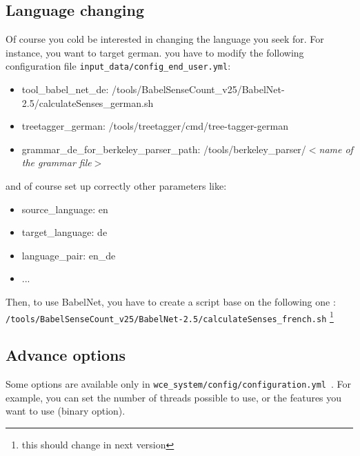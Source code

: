 \documentclass[a4paper,12pt]{article}
\begin{document}
\subsection{Language changing}
Of course you cold be interested in changing the language you seek for. For instance, you want to target german.
you have to modify the following configuration file \texttt{input\_data/config\_end\_user.yml}:
\begin{itemize}
 \item tool\_babel\_net\_de: /tools/BabelSenseCount\_v25/BabelNet-2.5/calculateSenses\_german.sh
 \item treetagger\_german: /tools/treetagger/cmd/tree-tagger-german
 \item grammar\_de\_for\_berkeley\_parser\_path: /tools/berkeley\_parser/$<$\textit{name of the grammar file}$>$
\end{itemize}
and of course set up correctly other parameters like:
\begin{itemize}
 \item source\_language: en
 \item target\_language: de
 \item language\_pair: en\_de
 \item ...
\end{itemize}
Then, to use BabelNet, you have to create a script base on the following one : 
\texttt{/tools/BabelSenseCount\_v25/BabelNet-2.5/calculateSenses\_french.sh}
\footnote{this should change in next version}

\subsection{Advance options}
Some options are available only in \texttt{wce\_system/config/configuration.yml}~.
For example, you can set the number of threads possible to use, or the features you want to use (binary option).
 
\end{document}
